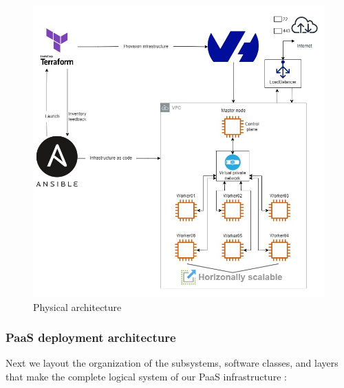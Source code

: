\begin{figure}[H]\centering
\includegraphics[width=1.0\textwidth,angle=00]{assets/f7.jpg}
\caption{Physical architecture}
\label{fig:f7}
\end{figure}

\subsubsection{PaaS deployment architecture} 
Next we layout the organization of the subsystems, software classes, and layers that make the complete logical system of our PaaS infrastructure :

